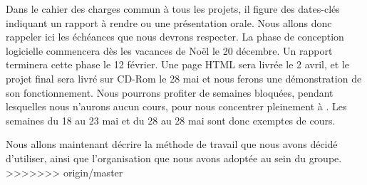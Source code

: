 	Dans le cahier des charges commun à tous les projets, il figure des dates-clés indiquant un rapport à rendre ou une présentation orale. Nous allons donc rappeler ici les échéances que nous devrons respecter. La phase de conception logicielle commencera dès les vacances de Noël le 20 décembre. Un rapport terminera cette phase le 12 février. Une page HTML sera livrée le 2 avril, et le projet final sera livré sur CD-Rom le 28 mai et nous ferons une démonstration de son fonctionnement.
	Nous pourrons profiter de semaines \og bloquées\fg{}, pendant lesquelles nous n'aurons aucun cours, pour nous concentrer pleinement à \glasir{}. Les semaines du 18 au 23 mai et du 28 au 28 mai sont donc exemptes de cours. 

Nous allons maintenant décrire la méthode de travail que nous avons décidé d'utiliser, ainsi que l'organisation que nous avons adoptée au sein du groupe.
>>>>>>> origin/master
